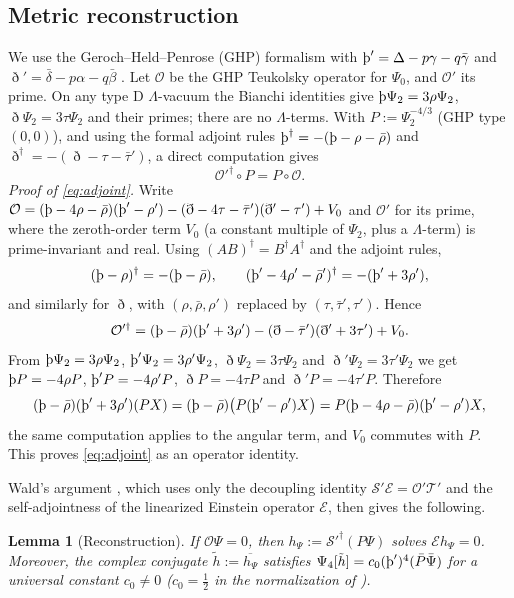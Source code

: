 \documentclass[11pt]{amsart}
\newtheorem{lemma}[theorem]{Lemma}
\theoremstyle{definition}
\theoremstyle{remark}
\numberwithin{equation}{section}
\newcommand{\Th}{\text{\th}}
\begin{document}
\subsection{Metric reconstruction}
We use the Geroch--Held--Penrose (GHP) formalism with $\Th'=\Delta-p\gamma-q\bar\gamma$ and
$\eth'=\bar\delta-p\alpha-q\bar\beta$ \cite{GHP73}. Let $\mathcal O$ be the GHP Teukolsky operator for $\Psi_0$, and
$\mathcal O'$ its prime. On any type D $\Lambda$-vacuum the Bianchi identities give $\Th\Psi_2=3\rho\Psi_2$,
$\eth\Psi_2=3\tau\Psi_2$ and their primes; there are no $\Lambda$-terms. With $P:=\Psi_2^{-4/3}$ (GHP type $(0,0)$),
and using the formal adjoint rules $\Th^\dagger=-(\Th-\rho-\bar\rho)$ and $\eth^\dagger=-(\eth-\tau-\bar\tau')$, a
direct computation gives
\begin{equation}\label{eq:adjoint}
\mathcal O'^\dagger\circ P=P\circ\mathcal O.
\end{equation}
\emph{Proof of \eqref{eq:adjoint}.} Write $\mathcal O=(\Th-4\rho-\bar\rho)(\Th'-\rho')-(\eth-4\tau-\bar\tau')(\eth'-\tau')+V_0$
and $\mathcal O'$ for its prime, where the zeroth-order term $V_0$ (a constant multiple of $\Psi_2$, plus a $\Lambda$-term) is
prime-invariant and real. Using $(AB)^\dagger=B^\dagger A^\dagger$ and the adjoint rules,
\[
(\Th-\rho)^\dagger=-(\Th-\bar\rho),\qquad(\Th'-4\rho'-\bar\rho')^\dagger=-(\Th'+3\rho'),
\]
and similarly for $\eth$, with $(\rho,\bar\rho,\rho')$ replaced by $(\tau,\bar\tau',\tau')$. Hence
\[
\mathcal O'^\dagger=(\Th-\bar\rho)(\Th'+3\rho')-(\eth-\bar\tau')(\eth'+3\tau')+V_0.
\]
From $\Th\Psi_2=3\rho\Psi_2$, $\Th'\Psi_2=3\rho'\Psi_2$, $\eth\Psi_2=3\tau\Psi_2$ and $\eth'\Psi_2=3\tau'\Psi_2$ we get
$\Th P=-4\rho P$, $\Th'P=-4\rho'P$, $\eth P=-4\tau P$ and $\eth'P=-4\tau'P$. Therefore
\[
(\Th-\bar\rho)(\Th'+3\rho')(PX)=(\Th-\bar\rho)\big(P(\Th'-\rho')X\big)=P(\Th-4\rho-\bar\rho)(\Th'-\rho')X,
\]
the same computation applies to the angular term, and $V_0$ commutes with $P$. This proves \eqref{eq:adjoint} as an
operator identity.

Wald's argument \cite{Wal78}, which uses only the decoupling identity $\mathcal S'\mathcal E=\mathcal O'\mathcal T'$
and the self-adjointness of the linearized Einstein operator $\mathcal E$, then gives the following.

\begin{lemma}[Reconstruction]\label{lem:recon}
If $\mathcal O\Psi=0$, then $h_\Psi:=\mathcal S'^\dagger(P\Psi)$ solves $\mathcal E h_\Psi=0$. Moreover, the complex
conjugate $\tilde h:=\overline{h_\Psi}$ satisfies $\Psi_4[\tilde h]=c_0(\Th')^4(\bar P\bar\Psi)$ for a universal constant
$c_0\neq0$ ($c_0=\frac12$ in the normalization of \cite{KSFK03}).
\end{lemma}
\end{document}

